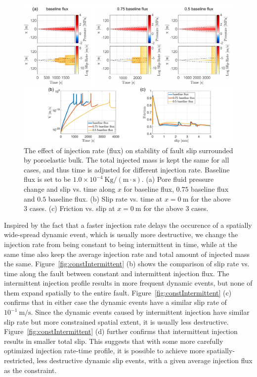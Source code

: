 \begin{figure}[htbp]
    \centering
    \includegraphics[width=1.0\textwidth]{figures/flux_poro.pdf}
    \caption{The effect of injection rate (flux) on stability of fault slip surrounded by poroelastic bulk. 
    The total injected mass is kept the same for all cases, 
    and thus time is adjusted for different injection rate. 
    Baseline flux is set to be $1.0\times10^{-4}\ \mathrm{Kg / (m \cdot s)}$.
    (a) Pore fluid pressure change and slip vs. time along $x$ for baseline flux, $0.75$ baseline flux and $0.5$ baseline flux. 
    (b) Slip rate vs. time at $x = 0\ \mathrm{m}$ for the above 3 cases. 
    (c) Friction vs. slip at $x = 0\ \mathrm{m}$ for the above 3 cases.}
    \label{fig:fluxPoro}
\end{figure}

Inspired by the fact that a faster injection rate delays the occurence of a spatially wide-spread dynamic event, 
which is usually more destructive, 
we change the injection rate from being constant to being intermittent in time, 
while at the same time also keep the average injection rate and total amount of injected mass the same. 
Figure~\ref{fig:constIntermittent} (b) shows the comparison of slip rate vs. time along the fault between constant and intermittent injection flux. 
The intermittent injection profile results in more frequent dynamic events, 
but none of them expand spatially to the entire fault. 
Figure~\ref{fig:constIntermittent} (c) confirms that in either case the dynamic events have a similar slip rate of $10^{-1}\ \mathrm{m/s}$. 
Since the dynamic events caused by intermittent injection have similar slip rate but more constrained spatial extent, 
it is usually less destructive. 
Figure~\ref{fig:constIntermittent} (d) further confirms that intermittent injection results in smaller total slip. 
This suggests that with some more carefully optimized injection rate-time profile, 
it is possible to achieve more spatially-restricted, 
less destructive dynamic slip events, 
with a given average injection flux as the constraint. 

